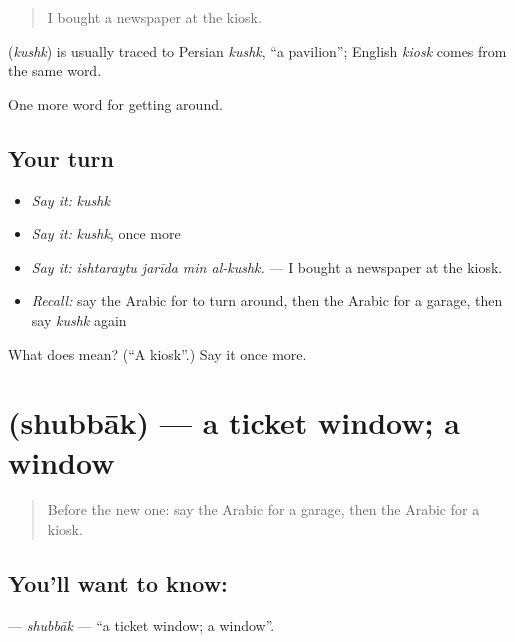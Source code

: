 \begin{quote}
I bought a newspaper at the kiosk.
\end{quote}

\begin{cousinweb}
\textbf{} (\emph{kushk}) is usually traced to Persian \emph{kushk}, \textquotedblleft{}a pavilion\textquotedblright{}; English \emph{kiosk} comes from the same word.
\end{cousinweb}

\begin{grammarlens}[title={What you've built}]
One more word for getting around.
\end{grammarlens}

\subsection*{Your turn}
\begin{itemize}
\raggedright
  \item \emph{Say it:} \emph{kushk}
  \item \emph{Say it:} \emph{kushk}, once more
  \item \emph{Say it:} \emph{ishtaraytu jarīda min al-kushk.} — I bought a newspaper at the kiosk.
  \item \emph{Recall:} say the Arabic for to turn around, then the Arabic for a garage, then say \emph{kushk} again
\end{itemize}

\begin{tcolorbox}[breakable,colback=teal!4,colframe=teal!35!black,title={Before you move on}]
What does  mean? (\textquotedblleft{}A kiosk\textquotedblright{}.) Say it once more.
\end{tcolorbox}
\section[\texorpdfstring{\ar{شباك} (shubbāk)}{شباك (shubbāk)}]{ (shubbāk) — a ticket window; a window}

\label{lesson:AR-C436-shubbak}



\begin{quote}
Before the new one: say the Arabic for a garage, then the Arabic for a kiosk.
\end{quote}

\subsection*{You'll want to know: }
\textbf{} — \emph{shubbāk} — \textquotedblleft{}a ticket window; a window\textquotedblright{}.

